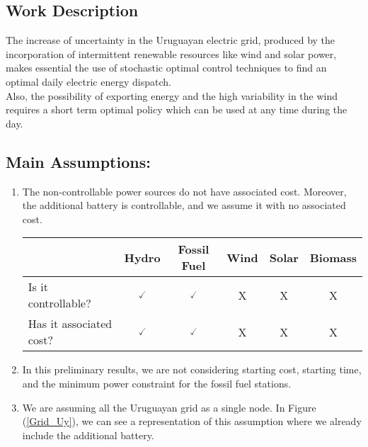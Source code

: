 \documentclass[ima, 20pt, portrait, plainboxedsections]{sciposter}
\begin{document}
\begin{multicols}{3}
\section*{Work Description}

The increase of uncertainty in the Uruguayan electric grid, produced by the incorporation of intermittent renewable resources like wind and solar power, makes essential the use of stochastic optimal control techniques to find an optimal daily electric energy dispatch.\\
Also, the possibility of exporting energy and the high variability in the wind requires a short term optimal policy which can be used at any time during the day.

\subsection*{{\color{red}Main Assumptions:}}

\begin{enumerate}

\item[{\color{red}(1)}] The non-controllable power sources do not have associated cost. Moreover, the additional battery is controllable, and we assume it with no associated cost.

\begin{center}
\begin{minipage}{0.26\textwidth}
\begin{table}
\begin{tabular}{|l|ccccc|}
 \toprule
 & Hydro & Fossil Fuel & Wind & Solar & Biomass \\
 \midrule
Is it controllable? & $\checked$ & $\checked$ & X & X & X \\
Has it associated cost? & $\checked$ & $\checked$ & X & X & X \\
\bottomrule
\end{tabular}
\end{table}
\end{minipage}
\end{center} 

\item[{\color{red}(2)}] In this preliminary results, we are not considering starting cost, starting time, and the minimum power constraint for the fossil fuel stations.

\item[{\color{red}(3)}] We are assuming all the Uruguayan grid as a single node. In Figure (\ref{Grid_Uy}), we can see a representation of this assumption where we already include the additional battery.


\end{enumerate}
\end{multicols}
\end{document}
